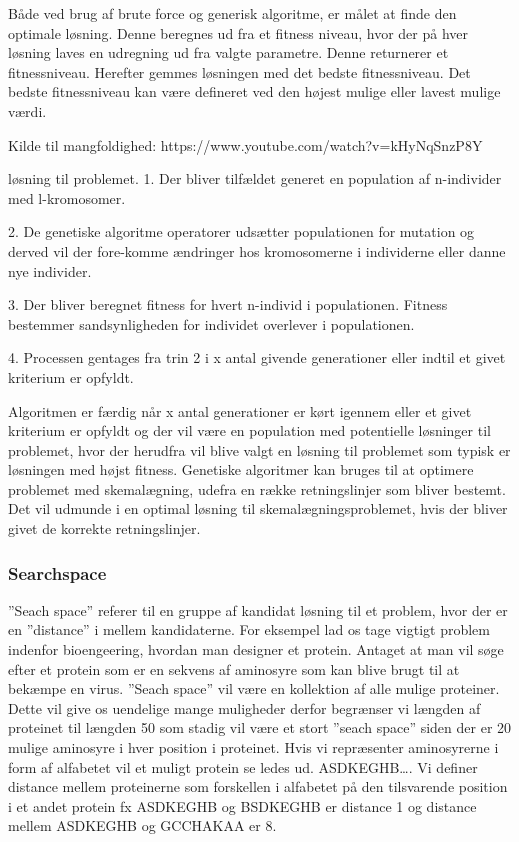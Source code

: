 Både ved brug af brute force og generisk algoritme, er målet at finde den optimale løsning. Denne beregnes ud fra et fitness niveau, hvor der på hver løsning laves en udregning ud fra valgte parametre. Denne returnerer et fitnessniveau. Herefter gemmes løsningen med det bedste fitnessniveau. Det bedste fitnessniveau kan være defineret ved den højest mulige eller lavest mulige værdi.  
 
Kilde til mangfoldighed: https://www.youtube.com/watch?v=kHyNqSnzP8Y 

løsning til problemet.
1.	Der bliver tilfældet generet en population af n-individer med l-kromosomer.

2.	De genetiske algoritme operatorer udsætter populationen for mutation og derved vil der fore-komme ændringer hos kromosomerne i individerne eller danne nye individer.

3.	Der bliver beregnet fitness for hvert n-individ i populationen. Fitness bestemmer sandsynligheden for individet overlever i populationen.

4.	Processen gentages fra trin 2 i x antal givende generationer eller indtil et givet kriterium er opfyldt.

Algoritmen er færdig når x antal generationer er kørt igennem eller et givet kriterium er opfyldt og der vil være en population med potentielle løsninger til problemet, hvor der herudfra vil blive valgt en løsning til problemet som typisk er løsningen med højst fitness. Genetiske algoritmer kan bruges til at optimere problemet med skemalægning, udefra en række retningslinjer som bliver bestemt. Det vil udmunde i en optimal løsning til skemalægningsproblemet, hvis der bliver givet de korrekte retningslinjer.

\subsubsection{Searchspace}

”Seach space” referer til en gruppe af kandidat løsning til et problem, hvor der er en ”distance” i mellem kandidaterne. For eksempel lad os tage vigtigt problem indenfor bioengeering, hvordan man designer et protein. Antaget at man vil søge efter et protein som er en sekvens af aminosyre som kan blive brugt til at bekæmpe en virus. ”Seach space” vil være en kollektion af alle mulige proteiner. Dette vil give os uendelige mange muligheder derfor begrænser vi længden af proteinet til længden 50 som stadig vil være et stort ”seach space” siden der er 20 mulige aminosyre i hver position i proteinet. Hvis vi repræsenter aminosyrerne i form af alfabetet vil et muligt protein se ledes ud. 
ASDKEGHB…. Vi definer distance mellem proteinerne som forskellen i alfabetet på den tilsvarende position i et andet protein fx ASDKEGHB og BSDKEGHB er distance 1 og distance mellem ASDKEGHB og GCCHAKAA er 8.
